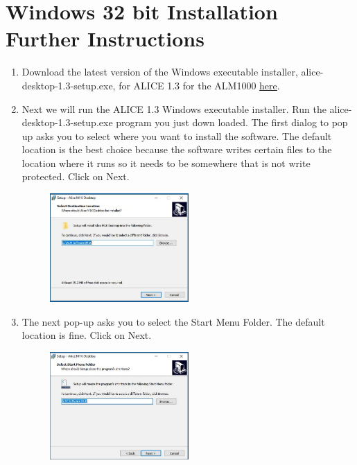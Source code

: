 \documentclass[12pt]{../manual}
\begin{document}
\newpage
\section{Windows 32 bit Installation Further Instructions}
\begin{enumerate}
\item Download the latest version of the Windows executable installer, alice-desktop-1.3-setup.exe, for ALICE 1.3 for the ALM1000  \href{https://github.com/analogdevicesinc/alice/releases}{here}. 
\item Next we will run the ALICE 1.3 Windows executable installer. Run the alice-desktop-1.3-setup.exe program you just down loaded. The first dialog to pop up asks you to select where you want to install the software. The default location is the best choice because the software writes certain files to the location where it runs so it needs to be somewhere that is not write protected. Click on Next.
\begin{figure}[!ht]
\begin{center}
\includegraphics[width=0.5\textwidth]{figures/FileLoc}
\end{center}
\end{figure}
\item The next pop-up asks you to select the Start Menu Folder. The default location is fine. Click on Next.
\begin{figure}[!ht]
\begin{center}
\includegraphics[width=0.5\textwidth]{figures/StartMenu}

\end{center}
\end{figure}
\end{enumerate}
\end{document}
